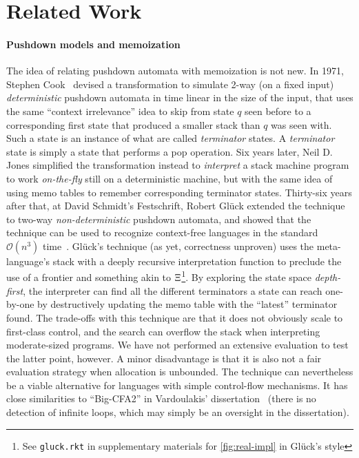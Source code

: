 \section{Related Work}

\paragraph{Pushdown models and memoization}
The idea of relating pushdown automata with memoization is not new.
%
In 1971, Stephen Cook~\citep{DBLP:conf/ifip/Cook71} devised a transformation to simulate 2-way (on a fixed input) \emph{deterministic} pushdown automata in time linear in the size of the input, that uses the same ``context irrelevance'' idea to skip from state $q$ seen before to a corresponding first state that produced a smaller stack than $q$ was seen with.
%
Such a state is an instance of what are called \emph{terminator} states.
%
A \emph{terminator} state is simply a state that performs a pop operation.
%
Six years later, Neil D. Jones\citep{Jones:1977:NLT} simplified the transformation instead to \emph{interpret} a stack machine program to work \emph{on-the-fly} still on a deterministic machine, but with the same idea of using memo tables to remember corresponding terminator states.
%
Thirty-six years after that, at David Schmidt's Festschrift, Robert Gl\"uck extended the technique to two-way \emph{non-deterministic} pushdown automata, and showed that the technique can be used to recognize context-free languages in the standard ${\mathcal O}(n^3)$ time~\citep{DBLP:journals/corr/Gluck13}.
%
Gl\"uck's technique (as yet, correctness unproven) uses the meta-language's stack with a deeply recursive interpretation function to preclude the use of a frontier and something akin to $\Xi$\footnote{See \texttt{gluck.rkt} in supplementary materials for \autoref{fig:real-impl} in Gl\"uck's style}.
%
By exploring the state space \emph{depth-first}, the interpreter can find all the different terminators a state can reach one-by-one by destructively updating the memo table with the ``latest'' terminator found.
%
The trade-offs with this technique are that it does not obviously scale to first-class control, and the search can overflow the stack when interpreting moderate-sized programs.
%
We have not performed an extensive evaluation to test the latter point, however.
%
A minor disadvantage is that it is also not a fair evaluation strategy when allocation is unbounded.
%
The technique can nevertheless be a viable alternative for languages with simple control-flow mechanisms.
%
It has close similarities to ``Big-CFA2'' in Vardoulakis' dissertation~\citep{vardoulakis-diss12} (there is no detection of infinite loops, which may simply be an oversight in the dissertation).

